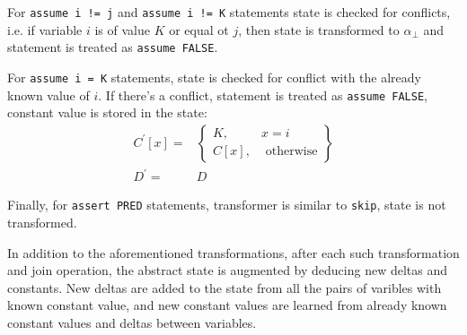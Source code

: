 For \texttt{assume i != j} and \texttt{assume i != K} statements state is checked for conflicts, i.e. if variable $i$ is of value $K$ or equal ot $j$, then state is transformed to $\alpha_\bot$ and statement is treated as \texttt{assume FALSE}.

For \texttt{assume i = K} statements, state is checked for conflict with the already known value of $i$. If there's a conflict, statement is treated as \texttt{assume FALSE}, constant value is stored in the state:
\begin{align*}
C^\prime[x] = & \left.
	\begin{cases}
		K, & x = i \\
		C[x], & \text{ otherwise}
	\end{cases}
\right\}\\
D^\prime = & D
\end{align*}


Finally, for \texttt{assert PRED} statements, transformer is similar to \texttt{skip}, state is not transformed.

In addition to the aforementioned transformations, after each such transformation and join operation, the abstract state is augmented by deducing new deltas and constants. New deltas are added to the state from all the pairs of varibles with known constant value, and new constant values are learned from already known constant values and deltas between variables.